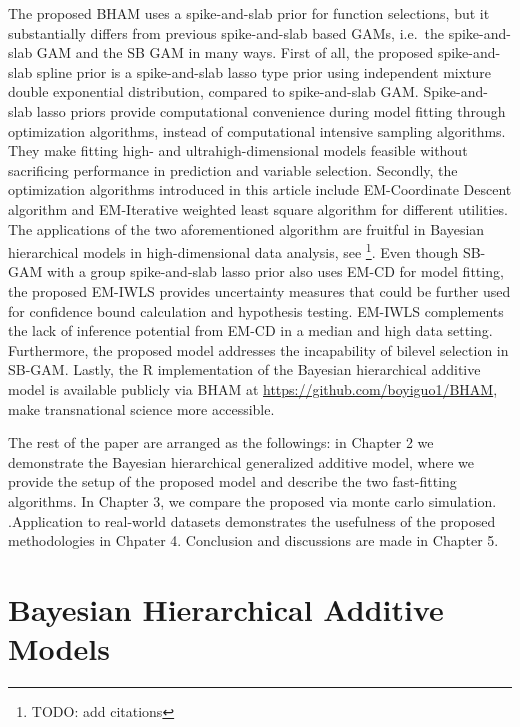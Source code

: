 \documentclass[AMA,STIX1COL,]{WileyNJD-v2}
\begin{document}
The proposed BHAM uses a spike-and-slab prior for function selections,
but it substantially differs from previous spike-and-slab based GAMs,
i.e.~the spike-and-slab GAM \citep{Scheipl2012} and the SB GAM
\citep{Bai2021} in many ways. First of all, the proposed spike-and-slab
spline prior is a spike-and-slab lasso type prior using independent
mixture double exponential distribution, compared to spike-and-slab GAM.
Spike-and-slab lasso priors provide computational convenience during
model fitting through optimization algorithms, instead of computational
intensive sampling algorithms. They make fitting high- and
ultrahigh-dimensional models feasible without sacrificing performance in
prediction and variable selection. Secondly, the optimization algorithms
introduced in this article include EM-Coordinate Descent algorithm and
EM-Iterative weighted least square algorithm for different utilities.
The applications of the two aforementioned algorithm are fruitful in
Bayesian hierarchical models in high-dimensional data analysis, see
\footnote{TODO: add citations}. Even though SB-GAM with a group
spike-and-slab lasso prior also uses EM-CD for model fitting, the
proposed EM-IWLS provides uncertainty measures that could be further
used for confidence bound calculation and hypothesis testing. EM-IWLS
complements the lack of inference potential from EM-CD in a median and
high data setting. Furthermore, the proposed model addresses the
incapability of bilevel selection in SB-GAM. Lastly, the R
implementation of the Bayesian hierarchical additive model is available
publicly via BHAM at \url{https://github.com/boyiguo1/BHAM}, make
transnational science more accessible.

The rest of the paper are arranged as the followings: in Chapter 2 we
demonstrate the Bayesian hierarchical generalized additive model, where
we provide the setup of the proposed model and describe the two
fast-fitting algorithms. In Chapter 3, we compare the proposed via monte
carlo simulation. .Application to real-world datasets demonstrates the
usefulness of the proposed methodologies in Chpater 4. Conclusion and
discussions are made in Chapter 5.

\hypertarget{bayesian-hierarchical-additive-models}{%
\section{Bayesian Hierarchical Additive
Models}\label{bayesian-hierarchical-additive-models}}
\end{document}
